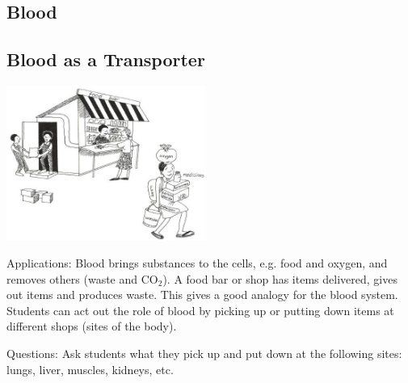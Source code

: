 \begin{multicols}{2}

\section*{Blood} 


\subsection{Blood as a Transporter} %

\begin{center}
\includegraphics[width=0.49\textwidth]{./img/vso/blood-transport.jpg}
\end{center}

\begin{description*}
\item[Applications:]{Blood brings substances to the
cells, e.g. food and oxygen, and
removes others (waste and CO$_2$).
A food bar or shop has items
delivered, gives out items and
produces waste. This gives a good
analogy for the blood system.
Students can act out the role of
blood by picking up or putting
down items at different shops
(sites of the body).}
\item[Questions:]{Ask students what they pick up and put down at the following sites: lungs, liver, muscles, kidneys, etc.}
\end{description*}


\end{multicols}
